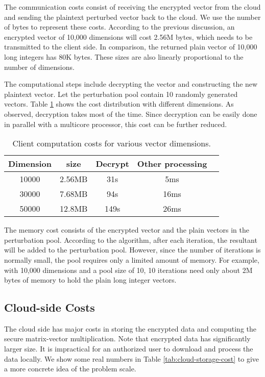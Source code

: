 \documentclass[10pt, conference, compsocconf]{IEEEtran}
\begin{document}
The communication costs consist of receiving the encrypted vector from the cloud and sending the plaintext perturbed vector back to the cloud. We use the number of bytes to represent these costs. According to the previous discussion, an encrypted vector of 10,000 dimensions will cost 2.56M bytes, which needs to be transmitted to the client side. In comparison, the returned plain vector of 10,000 long integers has 80K bytes. These sizes are also linearly proportional to the number of dimensions.

The computational steps include decrypting the vector and constructing the new plaintext vector. Let the perturbation pool contain 10 randomly generated vectors. Table \ref{tab:client-comp-cost} shows the cost distribution with different dimensions. As observed, decryption takes most of the time. Since decryption can be easily done in parallel with a multicore processor, this cost can be further reduced.   

\begin{table}[tbh]
\centering
\scriptsize
\begin{tabular}{|c|c|c|c|c|}
\hline
Dimension &  size & Decrypt  & Other processing \\
\hline
10000& 2.56MB& 31s & 5ms \\
30000& 7.68MB &94s & 16ms \\
50000& 12.8MB & 149s & 26ms \\
\hline
\end{tabular}
\caption{Client computation costs for various vector dimensions.} \label{tab:client-comp-cost}
\vspace{-0.5cm}
\normalsize
\end{table}
The memory cost consists of the encrypted vector and the plain vectors in the perturbation pool. According to the algorithm, after each iteration, the resultant  will be added to the perturbation pool. However, since the number of iterations is normally small, the pool requires only a limited amount of memory. For example, with 10,000 dimensions and a pool size of 10, 10 iterations need only about 2M bytes of memory to hold the plain long integer vectors.


\subsection{Cloud-side Costs}
The cloud side has major costs in storing the encrypted data and computing the secure matrix-vector multiplication. Note that encrypted data has significantly larger size. It is impractical for an authorized user to download and process the data locally. We show some real numbers in Table \ref{tab:cloud-storage-cost} to give a more concrete idea of the problem scale. 
\end{document}
